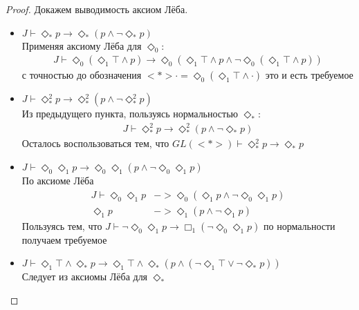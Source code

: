 \documentclass[12pt,a4paper,oneside]{article}
\begin{document}
  \begin{proof}
    Докажем выводимость аксиом Лёба.
    \begin{itemize}
      \item $J \vdash \Diamond_* p \rightarrow \Diamond_* (p \wedge \neg \Diamond_* p)$\\
            Применяя аксиому Лёба для $\Diamond_0 $:
            \begin{align*}
              J \vdash \Diamond_0 (\Diamond_1 \top \wedge p) \rightarrow \Diamond_0 (\Diamond_1 \top
              \wedge p \wedge \neg \Diamond_0 (\Diamond_1 \top \wedge p))
            \end{align*}
            с точностью до обозначения $<*>\cdot = \Diamond_0 (\Diamond_1
            \top \wedge \cdot)$ это и есть требуемое
      \item $J \vdash \Diamond_* ^2 p \rightarrow \Diamond_* ^2(p \wedge \neg \Diamond_* ^2 p)$\\
            Из предыдущего пункта, пользуясь нормальностью
            $\Diamond_* $:
            \begin{align*}
              J \vdash \Diamond_* ^2 p \rightarrow \Diamond_* ^2(p \wedge \neg \Diamond_* p)
            \end{align*}
            Осталось воспользоваться тем, что $GL(<*>) \vdash
            \Diamond_* ^2 p \rightarrow \Diamond_* p$
      \item $J \vdash \Diamond_0 \Diamond_1 p \rightarrow \Diamond_0 \Diamond_1 (p \wedge \neg
            \Diamond_0 \Diamond_1 p)$\\ По аксиоме Лёба
            \begin{align*}
              J \vdash \Diamond_0 \Diamond_1 p &-> \Diamond_0 (\Diamond_1 p \wedge \neg \Diamond_0
              \Diamond_1 p)\\
              \Diamond_1 p &-> \Diamond_1 (p \wedge \neg \Diamond_1 p)
            \end{align*}
            Пользуясь тем, что $J \vdash \neg \Diamond_0 \Diamond_1 p \rightarrow
            \Box_1 (\neg \Diamond_0 \Diamond_1 p)$ по нормальности получаем
            требуемое
      \item $J \vdash \Diamond_1 \top \wedge \Diamond_* p \rightarrow \Diamond_1 \top \wedge
            \Diamond_* (p \wedge (\neg \Diamond_1 \top \vee \neg \Diamond_* p))$\\ Следует
            из аксиомы Лёба для $\Diamond_* $
    \end{itemize}
  \end{proof}
\end{document}
